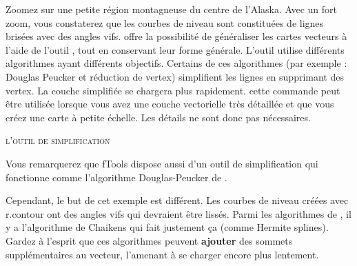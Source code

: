 {%
Zoomez sur une petite région montagneuse du centre de l'Alaska. Avec un fort zoom, vous constaterez que les courbes de niveau sont constituées de lignes brisées avec des angles vifs. \grass offre la possibilité de généraliser les cartes vecteurs à l'aide de l'outil , tout en conservant leur forme générale. L'outil utilise différents algorithmes ayant différents objectifs. Certains de ces algorithmes (par exemple : Douglas Peucker et réduction de vertex) simplifient les lignes en supprimant des vertex. La couche simplifiée se chargera plus rapidement. cette commande peut être utilisée lorsque vous avez une couche vectorielle très détaillée et que vous créez une carte à petite échelle. Les détails ne sont donc pas nécessaires.

\begin{Tip}\caption{\textsc{l'outil de simplification}}
Vous remarquerez que fTools dispose aussi d'un outil de simplification  qui fonctionne comme l'algorithme Douglas-Peucker de \grass {}.
\end{Tip}

Cependant, le but de cet exemple est différent. Les courbes de niveau créées avec r.contour ont des angles vifs qui devraient être lissés. Parmi les algorithmes de , il y a l'algorithme de Chaikens qui fait justement ça (comme Hermite splines). Gardez à l'esprit que ces algorithmes peuvent \textbf{ajouter} des sommets supplémentaires au vecteur, l'amenant à se charger encore plus lentement.

}
